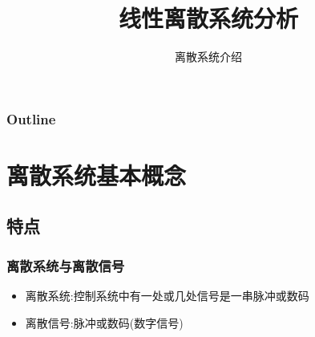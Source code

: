 \documentclass[table]{article}
\subtitle{离散系统介绍}
\title{线性离散系统分析}
\author{}
\date{}
\begin{document}
\maketitle

\begin{frame}
\frametitle{Outline}
\setcounter{tocdepth}{3}
\tableofcontents
\end{frame}













\section{离散系统基本概念}
\label{sec-1}
\subsection{特点}
\label{sec-1-1}
\begin{frame}
\frametitle{离散系统与离散信号}
\label{sec-1-1-1}

\begin{itemize}
\item <2->离散系统:控制系统中有一处或几处信号是一串脉冲或数码
\item <3->离散信号:脉冲或数码(数字信号)
\end{itemize}
\end{frame}
\end{document}
